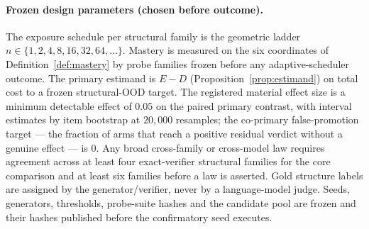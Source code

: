 \documentclass[11pt]{article}
\begin{document}
\paragraph{Frozen design parameters (chosen before outcome).}
The exposure schedule per structural family is the geometric ladder $n\in\{1,2,4,8,16,32,64,\dots\}$. Mastery is measured on the six coordinates of Definition~\ref{def:mastery} by probe families frozen before any adaptive-scheduler outcome. The primary estimand is $E-D$ (Proposition~\ref{prop:estimand}) on total cost to a frozen structural-OOD target. The registered material effect size is a minimum detectable effect of $0.05$ on the paired primary contrast, with interval estimates by item bootstrap at $20{,}000$ resamples; the co-primary false-promotion target --- the fraction of arms that reach a positive residual verdict without a genuine effect --- is $0$. Any broad cross-family or cross-model law requires agreement across at least four exact-verifier structural families for the core comparison and at least six families before a law is asserted. Gold structure labels are assigned by the generator/verifier, never by a language-model judge. Seeds, generators, thresholds, probe-suite hashes and the candidate pool are frozen and their hashes published before the confirmatory seed executes.
\end{document}
